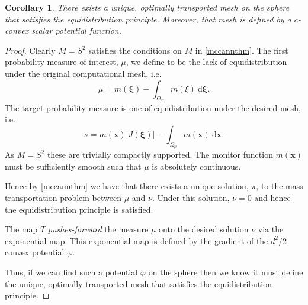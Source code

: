 \documentclass{article}
\newtheorem{corollary}{Corollary}
\theoremstyle{definition}
\begin{document}
\begin{corollary}
There exists a unique, optimally transported mesh on the sphere that satisfies the equidistribution principle. Moreover, that mesh is defined by a $c$-convex scalar potential function.
\end{corollary}

\begin{proof}
Clearly $M=S^2$ satisfies the conditions on $M$ in \autoref{mccannthm}. The first probability measure of interest, $\mu$, we define to be the lack of equidistribution under the original computational mesh, i.e.
\begin{equation}
\mu = m(\mathbf{\xi}) - \int_{\Omega_C}m(\xi) \ \mathrm{d}\mathbf{\xi}.
\end{equation}
The target probability measure is one of equidistribution under the desired mesh, i.e.
\begin{equation}
\nu = m(\mathbf{x})|J(\mathbf{\xi})| - \int_{\Omega_p}m(\mathbf{x}) \ \mathrm{d}\mathbf{x}.
\end{equation}
As $M=S^2$ these are trivially compactly supported. The monitor function $m(\mathbf{x})$ must be sufficiently smooth such that $\mu$ is absolutely continuous.

Hence by \autoref{mccannthm} we have that there exists a unique solution, $\pi$, to the mass transportation problem between $\mu$ and $\nu$. Under this solution, $\nu = 0$ and hence the equidistribution principle is satisfied.

The map $T$ \textit{pushes-forward} the measure $\mu$ onto the desired solution $\nu$ via the exponential map. This exponential map is defined by the gradient of the $d^2/2$-convex potential $\varphi$.

Thus, if we can find such a potential $\varphi$ on the sphere then we know it must define the unique, optimally transported mesh that satisfies the equidistribution principle.
\end{proof}






\end{document}
